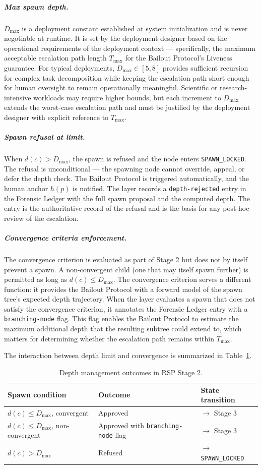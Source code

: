 \subparagraph{Max spawn depth.} $D_{\max}$ is a deployment constant established at system initialization and is never negotiable at runtime. It is set by the deployment designer based on the operational requirements of the deployment context — specifically, the maximum acceptable escalation path length $T_{\max}$ for the Bailout Protocol's Liveness guarantee. For typical deployments, $D_{\max} \in [5, 8]$ provides sufficient recursion for complex task decomposition while keeping the escalation path short enough for human oversight to remain operationally meaningful. Scientific or research-intensive workloads may require higher bounds, but each increment to $D_{\max}$ extends the worst-case escalation path and must be justified by the deployment designer with explicit reference to $T_{\max}$.

\subparagraph{Spawn refusal at limit.} When $d(c) > D_{\max}$, the spawn is refused and the node enters \texttt{SPAWN\_LOCKED}. The refusal is unconditional — the spawning node cannot override, appeal, or defer the depth check. The Bailout Protocol is triggered automatically, and the human anchor $h(p)$ is notified. The \bounds{} layer records a \texttt{depth-rejected} entry in the Forensic Ledger with the full spawn proposal and the computed depth. The entry is the authoritative record of the refusal and is the basis for any post-hoc review of the escalation.

\subparagraph{Convergence criteria enforcement.} The convergence criterion is evaluated as part of Stage 2 but does not by itself prevent a spawn. A non-convergent child (one that may itself spawn further) is permitted as long as $d(c) \leq D_{\max}$. The convergence criterion serves a different function: it provides the Bailout Protocol with a forward model of the spawn tree's expected depth trajectory. When the \bounds{} layer evaluates a spawn that does not satisfy the convergence criterion, it annotates the Forensic Ledger entry with a \texttt{branching-node} flag. This flag enables the Bailout Protocol to estimate the maximum additional depth that the resulting subtree could extend to, which matters for determining whether the escalation path remains within $T_{\max}$.

The interaction between depth limit and convergence is summarized in Table~\ref{tab:depth-management}.

\begin{table}[htbp]
\caption{Depth management outcomes in RSP Stage 2.}
\label{tab:depth-management}
\begin{tabular}{@{}lll@{}}
\toprule
Spawn condition & Outcome & State transition \\
\midrule
$d(c) \leq D_{\max}$, convergent & Approved & $\rightarrow$ Stage 3 \\
$d(c) \leq D_{\max}$, non-convergent & Approved with \texttt{branching-node} flag & $\rightarrow$ Stage 3 \\
$d(c) > D_{\max}$ & Refused & $\rightarrow$ \texttt{SPAWN\_LOCKED} \\
\midrule
\end{tabular}
\end{table}

